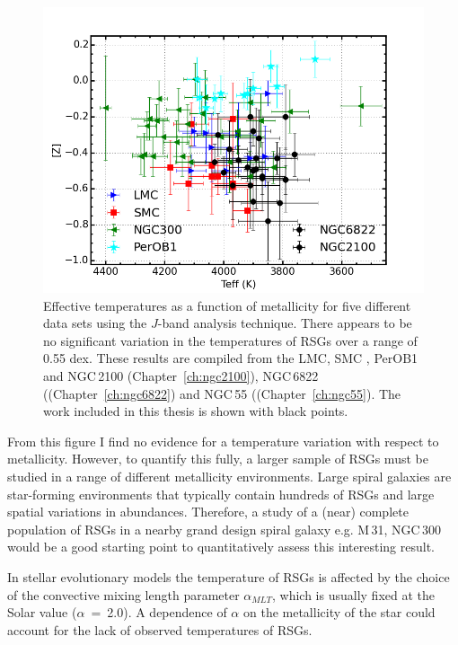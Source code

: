 \begin{figure}
 \centering
\includegraphics[width=\textwidth]{conclusions/RSGTeffvsZ-all}
\caption[Effective temperature as a function of metallicity in different environments]{
Effective temperatures as a function of metallicity for five different data sets using the $J$-band analysis technique.
There appears to be no significant variation in the temperatures of RSGs over a range of 0.55 dex.
These results are compiled from the LMC, SMC
\protect\citep[blue and red points respectively;][]{2015ApJ...806...21D}, PerOB1
\protect\citep[a Galactic RSG cluster; cyan;][]{2014ApJ...788...58G} and
NGC\,2100 (Chapter~\ref{ch:ngc2100}),
NGC\,6822 ((Chapter~\ref{ch:ngc6822})
and NGC\,55 ((Chapter~\ref{ch:ngc55}).
The work included in this thesis is shown with black points.
\label{fig:TeffvsZ}
         }
\end{figure}

From this figure I find no evidence for a temperature variation with respect to metallicity.
However, to quantify this fully, a larger sample of RSGs must be studied in a range of different metallicity environments.
Large spiral galaxies are star-forming environments that typically contain hundreds of RSGs and large spatial variations in abundances.
Therefore, a study of a (near) complete population of RSGs in a nearby grand design spiral galaxy e.g. M\,31, NGC\,300 would be a good starting point to quantitatively assess this interesting result.

In stellar evolutionary models the temperature of RSGs is affected by the choice of the convective mixing length parameter $\alpha_{MLT}$, which is usually fixed at the Solar value ($\alpha$~=~2.0).
A dependence of $\alpha$ on the metallicity of the star could account for the lack of observed temperatures of RSGs.

